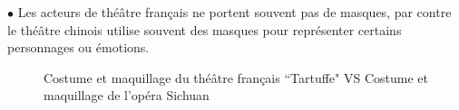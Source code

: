\documentclass[UTF8,a4paper,12pt]{ctexart}
\numberwithin{equation}{section}
\begin{document}
$\bullet$ Les acteurs de théâtre français ne portent souvent pas de masques, par contre le théâtre chinois utilise souvent des masques pour représenter certains personnages ou émotions.

%
%
%
%


\begin{figure}[h!]
\centering
{}%
\hspace*{0.5cm} %
\captionsetup{justification=centering, singlelinecheck=false}
\caption{Costume et maquillage du théâtre français ``Tartuffe" VS Costume et maquillage de l'opéra Sichuan}
\label{fig:horizontal_alignment}
\end{figure}
\end{document}
